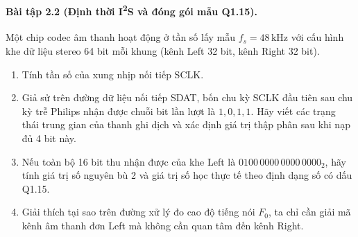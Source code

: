 \paragraph{Bài tập 2.2 (Định thời I\textsuperscript{2}S và đóng gói mẫu Q1.15).}
Một chip codec âm thanh hoạt động ở tần số lấy mẫu $f_s = 48\,\text{kHz}$ với cấu hình khe dữ liệu stereo 64 bit mỗi khung (kênh Left 32 bit, kênh Right 32 bit).
\begin{enumerate}[label=\alph*)]
    \item Tính tần số của xung nhịp nối tiếp SCLK.
    \item Giả sử trên đường dữ liệu nối tiếp SDAT, bốn chu kỳ SCLK đầu tiên sau chu kỳ trễ Philips nhận được chuỗi bit lần lượt là $1, 0, 1, 1$. Hãy viết các trạng thái trung gian của thanh ghi dịch và xác định giá trị thập phân sau khi nạp đủ 4 bit này.
    \item Nếu toàn bộ 16 bit thu nhận được của khe Left là $0100\,0000\,0000\,0000_2$, hãy tính giá trị số nguyên bù 2 và giá trị số học thực tế theo định dạng số có dấu Q1.15.
    \item Giải thích tại sao trên đường xử lý đo cao độ tiếng nói $F_0$, ta chỉ cần giải mã kênh âm thanh đơn Left mà không cần quan tâm đến kênh Right.
\end{enumerate}

